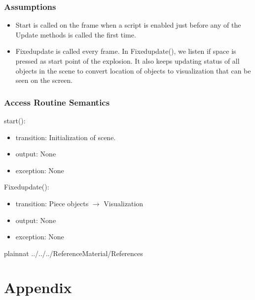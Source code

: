 \documentclass[12pt, titlepage]{article}
\begin{document}
\subsubsection{Assumptions}

\noindent
\begin{itemize}
	\item Start is called on the frame when a script is enabled just before any of the Update methods is called the first time.
	\item Fixedupdate is called every frame. In Fixedupdate(), we listen if space is pressed as start point of the explosion. It also keeps updating status of all objects in the scene to convert location of objects to visualization that can be seen on the screen.
\end{itemize}

\subsubsection{Access Routine Semantics}

\noindent start():
\begin{itemize}
	\item transition: Initialization of scene.
	\item output: None 
	\item exception: None  
\end{itemize}

\noindent Fixedupdate():
\begin{itemize}
	\item transition: Piece objects $\rightarrow$ Visualization 
	\item output: None 
	\item exception: None  
\end{itemize}

\newpage

 {plainnat}
 {../../../ReferenceMaterial/References}

\newpage

\section{Appendix} \label{Appendix}
\end{document}
